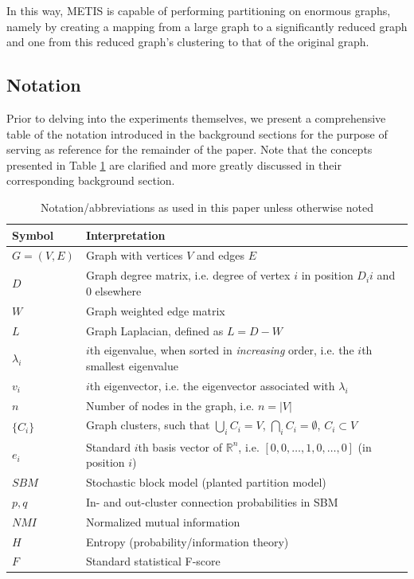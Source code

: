 \documentclass{article}
\begin{document}
In this way, METIS is capable of performing partitioning on enormous graphs, namely by creating a mapping from a large graph to a significantly reduced graph and one from this reduced graph's clustering to that of the original graph. 

\subsection{Notation}
Prior to delving into the experiments themselves, we present a comprehensive table of the notation introduced in the background sections for the purpose of serving as reference for the remainder of the paper. Note that the concepts presented in Table \ref{tab:notation} are clarified and more greatly discussed in their corresponding background section. 

\begin{table}[]
\centering
\caption[Mathematical Notation]{Notation/abbreviations as used in this paper unless otherwise noted}
\label{tab:notation}
\begin{tabular}{|l|l|}
\hline 
\textbf{Symbol} & \textbf{Interpretation} \\ \hline 
$G = (V,E)$ & Graph with vertices $V$ and edges $E$ \\\hline
$D$ & Graph degree matrix, i.e. degree of vertex $i$ in position $D_ii$ and 0 elsewhere \\\hline
$W$ & Graph weighted edge matrix \\\hline
$L$ & Graph Laplacian, defined as $L = D - W$ \\\hline
$\lambda_i$ & $i$th eigenvalue, when sorted in \textit{increasing} order, i.e. the $i$th smallest eigenvalue \\\hline
$v_i$ & $i$th eigenvector, i.e. the eigenvector associated with $\lambda_i$ \\\hline
$n$ & Number of nodes in the graph, i.e. $n=|V|$ \\\hline
$\{C_i\}$ & Graph clusters, such that $\bigcup_i C_i = V$, $\bigcap_i C_i = \emptyset$, $C_i \subset V$ \\\hline
$e_i$ & Standard $i$th basis vector of $\mathbb{R}^n$, i.e. $[0,0,\dots,1,0,\dots,0]$ (in position $i$) \\\hline
$SBM$ & Stochastic block model (planted partition model) \\\hline
$p,q$ & In- and out-cluster connection probabilities in SBM \\\hline
$NMI$ & Normalized mutual information \\\hline
$H$ & Entropy (probability/information theory) \\\hline
$F$ & Standard statistical F-score \\\hline
\end{tabular}
\end{table}
\end{document}
